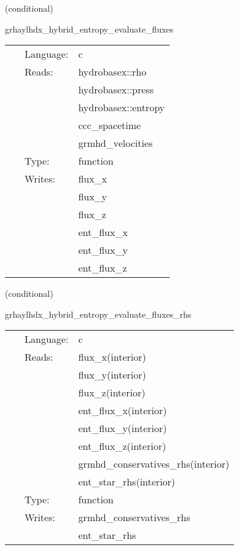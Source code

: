 \documentclass{article}
\begin{document}
\vspace{5mm}

   (conditional) 

\hspace{5mm} grhaylhdx\_hybrid\_entropy\_evaluate\_fluxes 

\hspace{5mm}{\it entropy+hybrid version of grhaylhdx\_evaluate\_fluxes } 


\hspace{5mm}

 \begin{tabular*}{160mm}{cll} 
~ & Language:  & c \\ 
~ & Reads:  & hydrobasex::rho \\ 
~& ~ &hydrobasex::press\\ 
~& ~ &hydrobasex::entropy\\ 
~& ~ &ccc\_spacetime\\ 
~& ~ &grmhd\_velocities\\ 
~ & Type:  & function \\ 
~ & Writes:  & flux\_x \\ 
~& ~ &flux\_y\\ 
~& ~ &flux\_z\\ 
~& ~ &ent\_flux\_x\\ 
~& ~ &ent\_flux\_y\\ 
~& ~ &ent\_flux\_z\\ 
\end{tabular*} 


\vspace{5mm}

   (conditional) 

\hspace{5mm} grhaylhdx\_hybrid\_entropy\_evaluate\_fluxes\_rhs 

\hspace{5mm}{\it entropy+hybrid version of grhaylhdx\_evaluate\_fluxes\_rhs } 


\hspace{5mm}

 \begin{tabular*}{160mm}{cll} 
~ & Language:  & c \\ 
~ & Reads:  & flux\_x(interior) \\ 
~& ~ &flux\_y(interior)\\ 
~& ~ &flux\_z(interior)\\ 
~& ~ &ent\_flux\_x(interior)\\ 
~& ~ &ent\_flux\_y(interior)\\ 
~& ~ &ent\_flux\_z(interior)\\ 
~& ~ &grmhd\_conservatives\_rhs(interior)\\ 
~& ~ &ent\_star\_rhs(interior)\\ 
~ & Type:  & function \\ 
~ & Writes:  & grmhd\_conservatives\_rhs \\ 
~& ~ &ent\_star\_rhs\\ 
\end{tabular*} 
\end{document}
